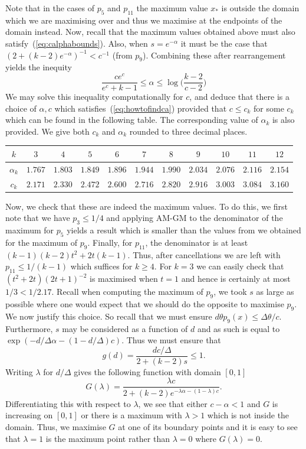 Note that in the cases of $p_5$ and $p_{11}$ the maximum value $x_*$ is outside the domain which we are maximising over and thus we maximise at the endpoints of the domain instead.
%
Now, recall that the maximum values obtained above must also satisfy~(\ref{eq:calphabounds}).
Also, when $s=e^{-\alpha}$ it must be the case that $(2+(k-2)e^{-\alpha})^{-1} <c^{-1}$ (from $p_9$).
Combining these after rearrangement yields the inequity
\begin{equation}
 \frac{ce^c}{e^c+k-1} \leq \alpha \leq \log\bigg(\frac{k-2}{c-2}\bigg)
 \label{eq:howtofindca}
\end{equation}
We may solve this inequality computationally for $c$, and deduce that there is a choice of $\alpha, c$ which satisfies~(\ref{eq:howtofindca}) provided that $c \leq c_k$ for some $c_k$ which can be found in the following table.
The corresponding value of $\alpha_k$ is also provided.
We give both $c_k$ and $\alpha_k$ rounded to three decimal places.
%
\begin{center}
 \begin{tabular}{c||c|c|c|c|c|c|c|c|c|c}  $k$ & $3$ & $4$ & $5$ & $6$ & $7$ & $8$ & $9$ & $10$ & $11$ & $12$ \\
 \hline
  $\alpha_k$ & $1.767$ & $1.803$ & $1.849$ & $1.896$ & $1.944$ & $1.990$ & $2.034$ & $2.076$ & $2.116$ & $2.154$ \\  \hline
  $c_k$ & $2.171$ & $2.330$ & $2.472$ & $2.600$ & $2.716$ & $2.820$ & $2.916$ & $3.003$ & $3.084$ & $3.160$ \\
 \end{tabular}
\end{center}
%
Now, we check that these are indeed the maximum values. To do this, we first note that we have $p_3 \leq 1/4$ and applying AM-GM to the denominator of the maximum for $p_5$ yields a result which is smaller than the values from we obtained for the maximum of $p_9$.
Finally, for $p_{11}$, the denominator is at least $(k-1)(k-2) t^2 +2t(k-1)$. Thus, after cancellations we are left with $p_{11} \leq 1/(k-1)$ which suffices for $k \geq 4$.
For $k=3$ we can easily check that $(t^2+2t)(2t+1)^{-2}$ is maximised when $t=1$ and hence is certainly at most $1/3 < 1/2.17$.
%
Recall when computing the maximum of $p_9$, we took $s$ as large as possible where one would expect that we should do the opposite to maximise $p_9$.
We now justify this choice.
So recall that we must ensure $d\theta p_9(x) \leq \Delta \theta/c$.
Furthermore, $s$ may be considered as a function of $d$ and as such is equal to $\exp(-d/\Delta \alpha - (1-d/\Delta)c)$.
Thus we must ensure that
$$
g(d)=\frac{dc/\Delta}{2+(k-2)s} \leq 1.
$$
Writing $\lambda$ for $d/\Delta$ gives the following function with domain $[0,1]$
$$
G(\lambda)=\frac{\lambda c}{2+(k-2)e^{-\lambda \alpha -(1-\lambda)c}}.
$$
Differentiating this with respect to $\lambda$, we see that either $c-\alpha<1$ and $G$ is increasing on $[0,1]$ or there is a maximum with $\lambda >1$ which is not inside the domain.
Thus, we maximise $G$ at one of its boundary points and it is easy to see that $\lambda=1$ is the maximum point rather than $\lambda =0$ where $G(\lambda)=0$.
%
%
%
